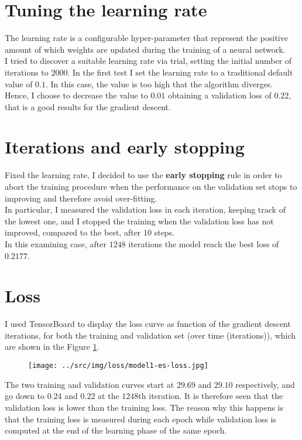 \documentclass[a4paper,12pt]{article} %
\begin{document}
	\section{Tuning the learning rate}
	The learning rate is a configurable hyper-parameter that represent the positive amount of which weights are updated during the training of a neural network.\\
	I tried to discover a suitable learning rate via trial, setting the initial number of iterations to $2000$.
	In the first test I set the learning rate to a traditional default value of $0.1$. In this case, the value is too high that the algorithm diverges.\\
	Hence, I choose to decrease the value to $0.01$ obtaining a validation loss of $0.22$, that is a good results for the gradient descent.
	
	\section{Iterations and early stopping}
	Fixed the learning rate, I decided to use the \textbf{early stopping} rule in order to abort the training procedure when the performance on the validation set stops to improving and therefore avoid over-fitting. \\
	In particular, I measured the validation loss in each iteration, keeping track of the lowest one, and I stopped the training when the validation loss has not improved, compared to the best, after $10$ steps.\\
	In this examining case, after $1248$ iterations the model reach the best loss of $0.2177$.
	
	\section{Loss}
	I used {TensorBoard} to display the loss curve as function of the gradient 
	descent iterations, for both the 
	training and validation set (over time (iterations)), which are shown in 
	the Figure \ref{fig:model1-loss}.
	
	\begin{figure}[ht]
		\centering
		\texttt{[image: ../src/img/loss/model1-es-loss.jpg]}
		\label{fig:model1-loss}
	\end{figure}
	
	The two training and validation curves start at $29.69$ and $29.10$ respectively, and go down to $0.24$ and $0.22$ at the $1248\mathrm{th}$ iteration.
	It is therefore seen that the validation loss is lower than the training loss. The reason why this happens is that the training loss is measured during each epoch while validation loss is computed at the end of the learning phase of the same epoch.
	
\end{document}
